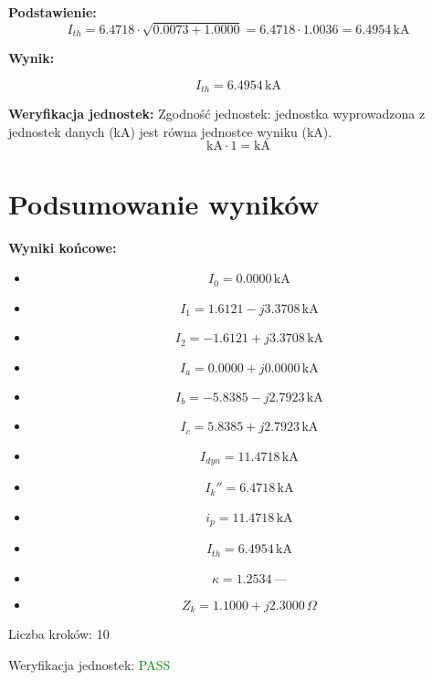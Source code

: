 \documentclass[11pt,a4paper]{article}
\begin{document}
\textbf{Podstawienie:}
$$
I_{th} = 6.4718 \cdot \sqrt{0.0073 + 1.0000} = 6.4718 \cdot 1.0036 = 6.4954\,\text{kA}
$$

\textbf{Wynik:}
\begin{center}
$$
I_{th} = 6.4954\,\mathrm{kA}
$$
\end{center}

\textbf{Weryfikacja jednostek:} Zgodność jednostek: jednostka wyprowadzona z jednostek danych (kA) jest równa jednostce wyniku (kA).
$$
\mathrm{kA} \cdot 1 = \mathrm{kA}
$$

\section{Podsumowanie wyników}

\textbf{Wyniki końcowe:}
\begin{itemize}
  \item
$$
I_0 = 0.0000\,\mathrm{kA}
$$
  \item
$$
I_1 = 1.6121 - j3.3708\,\mathrm{kA}
$$
  \item
$$
I_2 = -1.6121 + j3.3708\,\mathrm{kA}
$$
  \item
$$
I_a = 0.0000 + j0.0000\,\mathrm{kA}
$$
  \item
$$
I_b = -5.8385 - j2.7923\,\mathrm{kA}
$$
  \item
$$
I_c = 5.8385 + j2.7923\,\mathrm{kA}
$$
  \item
$$
I_{dyn} = 11.4718\,\mathrm{kA}
$$
  \item
$$
I_k'' = 6.4718\,\mathrm{kA}
$$
  \item
$$
i_p = 11.4718\,\mathrm{kA}
$$
  \item
$$
I_{th} = 6.4954\,\mathrm{kA}
$$
  \item
$$
\kappa = 1.2534\,\text{—}
$$
  \item
$$
Z_k = 1.1000 + j2.3000\,\Omega
$$
\end{itemize}

Liczba kroków: 10

Weryfikacja jednostek: \textcolor{green}{PASS}
\end{document}
